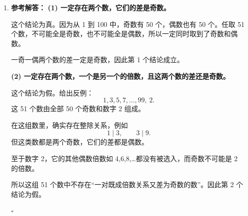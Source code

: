 \documentclass[11pt,a4paper,fontset=fandol]{ctexart}
\newenvironment{solution}{\par\noindent\textbf{参考解答：}}{\hfill$\square$\par}
\begin{document}
\begin{enumerate}
\begin{solution}
  去掉一个角格以后，第一行还剩下 6 个格子，可以用 3 块横放骨牌盖住。

  此时剩余部分正好是第 2 行到第 7 行构成的一个
  \[
  6\times 7
  \]
  长方形。对这个长方形，可以按列用竖放骨牌全部覆盖：每一列有 6 个格子，可用 3 块竖放骨牌盖满，共 7 列。

  因此整个去角后的 $7\times 7$ 棋盘可以被骨牌完全覆盖。

  \end{solution}

  \item \begin{solution}
  \textbf{(1) 一定存在两个数，它们的差是奇数。}

  这个结论为真。因为从 1 到 100 中，奇数有 50 个，偶数也有 50 个。任取 51 个数，不可能全是奇数，也不可能全是偶数，所以一定同时取到了奇数和偶数。

  一奇一偶两个数的差一定是奇数，因此第 1 个结论成立。

  \textbf{(2) 一定存在两个数，一个是另一个的倍数，且这两个数的差还是奇数。}

  这个结论为假。给出反例：
  \[
  1,3,5,7,\ldots,99,\ 2.
  \]
  这 51 个数由全部 50 个奇数和数字 2 组成。

  在这组数里，确实存在整除关系，例如
  \[
  1\mid 3,\qquad 3\mid 9.
  \]
  但这类数都是两个奇数，它们的差都是偶数。

  至于数字 2，它的其他偶数倍数如 4,6,8,\ldots 都没有被选入，而奇数不可能是 2 的倍数。

  所以这组 51 个数中不存在“一对既成倍数关系又差为奇数的数”。因此第 2 个结论为假。

  \end{solution}
\end{enumerate}
\end{document}
